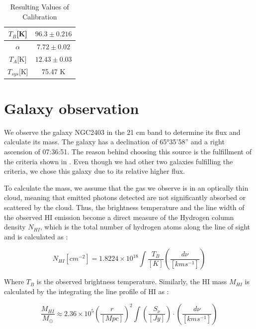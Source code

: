 \documentclass[12pt]{article}
\begin{document}
\begin{table}[H]
    \centering
    \begin{tabular}{c|c}
        \hline
        \hline
             $T_B$[K] &  $96.3 \pm 0.216$ \\
         \hline
             $\alpha$ & $7.72 \pm 0.02$\\ 
             $T_A$[K] & $12.43 \pm 0.03$\\ 
             $T_{sys}$[K] & 75.47 K\\ 
         \hline
    \end{tabular}
    \caption{Resulting Values of Calibration}
    \label{table1}
\end{table}
\section{Galaxy observation}
We observe the galaxy NGC2403 in the 21 cm band to determine its flux and calculate its mass. The galaxy has a declination of 65°35'58'' and a right ascension of 07:36:51.  The reason behind choosing this source is the fulfillment of the criteria shown in \cite{lecturenote}. Even though we had other two galaxies fulfilling the criteria, we chose this galaxy due to its relative higher flux.

To calculate the mass, we assume that the gas we observe is in an optically thin cloud, meaning that emitted photons detected are not significantly absorbed or scattered by the cloud. Thus, the brightness temperature and the line width of the observed HI emission become a direct measure of the Hydrogen column density $N_{HI}$, which is the total number of hydrogen atoms along the line of sight and is calculated as \cite{lecturenote}:

\begin{equation}
    N_{HI}[cm^{-2}] = 1.8224 \times 10^{18} \int \frac{T_B}{[K]} \left( \frac{d\nu}{[km s^{-1}]} \right) 
\end{equation}

Where $T_B$ is the observed brightness temperature. Similarly, the HI mass $M_{HI}$ is calculated by the integrating the line profile of HI as \cite{lecturenote}:

\begin{equation}
    \frac{M_{HI}}{M_{\odot}} \approx 
 2.36 \times 10^5 \left( \frac{r}{[Mpc]} \right)^2 \int \left( \frac{S_{\nu}}{[Jy]} \right) \cdot \left( \frac{d\nu}{[km 
 s^{-1}]} \right)
\label{mass}
\end{equation}
\end{document}
